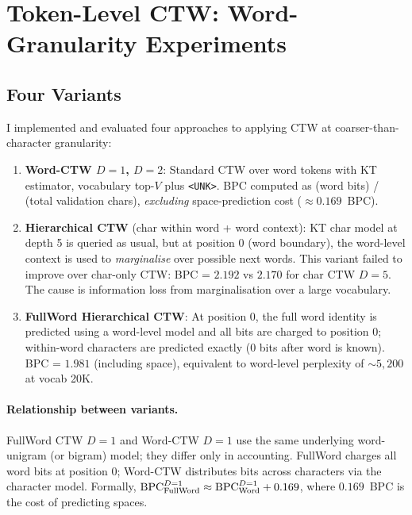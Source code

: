 \documentclass[11pt,a4paper]{article}
\begin{document}
\section{Token-Level CTW: Word-Granularity Experiments}
\label{sec:token}

\subsection{Four Variants}

I implemented and evaluated four approaches to applying CTW
at coarser-than-character granularity:

\begin{enumerate}[leftmargin=1.5em]
  \item \textbf{Word-CTW $D=1$, $D=2$}:
        Standard CTW over word tokens with KT estimator,
        vocabulary top-$V$ plus \texttt{<UNK>}.
        BPC computed as (word bits) / (total validation chars),
        \emph{excluding} space-prediction cost ($\approx 0.169$~BPC).

  \item \textbf{Hierarchical CTW} (char within word + word context):
        KT char model at depth 5 is queried as usual,
        but at position 0 (word boundary), the word-level context
        is used to \emph{marginalise} over possible next words.
        This variant failed to improve over char-only CTW:
        BPC = $2.192$ vs $2.170$ for char CTW $D=5$.
        The cause is information loss from marginalisation over a large vocabulary.

  \item \textbf{FullWord Hierarchical CTW}:
        At position 0, the full word identity is predicted
        using a word-level model and all bits are charged to position 0;
        within-word characters are predicted exactly (0 bits after word is known).
        BPC = $1.981$ (including space), equivalent to word-level perplexity of
        $\sim\!5{,}200$ at vocab 20K.
\end{enumerate}

\paragraph{Relationship between variants.}
FullWord CTW $D=1$ and Word-CTW $D=1$ use the same underlying word-unigram
(or bigram) model; they differ only in accounting.
FullWord charges all word bits at position 0; Word-CTW distributes
bits across characters via the character model.
Formally, $\mathrm{BPC}_{\rm FullWord}^{D=1} \approx \mathrm{BPC}_{\rm Word}^{D=1} + 0.169$,
where $0.169$~BPC is the cost of predicting spaces.
\end{document}
